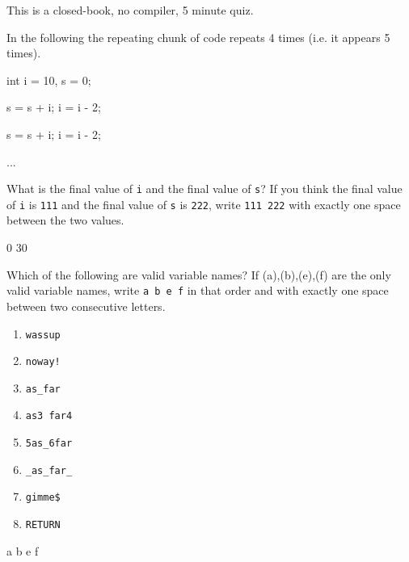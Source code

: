 

This is a closed-book, no compiler, 5 minute quiz.

\nextq
In the following
the repeating chunk of code repeats 4 times (i.e. it appears 5 times).
{\small
\begin{console}[commandchars=\@\{\}]
int i = 10, s = 0;

s = s + i;
i = i - 2;

s = s + i;
i = i - 2;

...
\end{console}
What is the final value of \verb!i! and the final value of \verb!s!?
If you think the final value of \verb!i! is \verb!111!
and the final value of \verb!s! is \verb!222!, write \verb!111 222!
with exactly one space between the two values.
\\
\ANSWER
\begin{answercode}
0 30
\end{answercode}

\nextq
Which of the following are valid variable names?
If (a),(b),(e),(f) are the only valid variable names, write \verb!a b e f!
in that order and with exactly one space between two consecutive letters.
\begin{enumerate}[nosep,label=(\alph*)]
\item  \hspace{0.5cm}\texttt{wassup}
\item  \hspace{0.5cm}\texttt{noway!}
\item  \hspace{0.5cm}\texttt{as\_far}
\item  \hspace{0.5cm}\texttt{as3 far4}
\item  \hspace{0.5cm}\texttt{5as\_6far}
\item  \hspace{0.5cm}\texttt{\_as\_far\_}
\item  \hspace{0.5cm}\texttt{gimme\$}
\item  \hspace{0.5cm}\texttt{RETURN}
\end{enumerate}
\ANSWER
\begin{answercode}
a b e f
\end{answercode}

}
